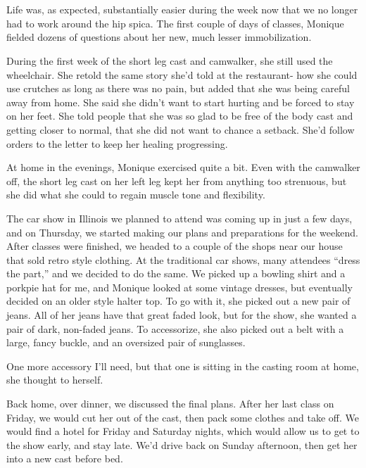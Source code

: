 \chapter{}

Life was, as expected, substantially easier during the week now that we no longer had to work
around the hip spica. The first couple of days of classes, Monique fielded dozens of questions
about her new, much lesser immobilization.

During the first week of the short leg cast and camwalker, she still used the wheelchair. She
retold the same story she'd told at the restaurant- how she could use crutches as long as there
was no pain, but added that she was being careful away from home. She said she didn't want to
start hurting and be forced to stay on her feet. She told people that she was so glad to be free
of the body cast and getting closer to normal, that she did not want to chance a setback. She'd
follow orders to the letter to keep her healing progressing.

At home in the evenings, Monique exercised quite a bit. Even with the camwalker off, the short
leg cast on her left leg kept her from anything too strenuous, but she did what she could to
regain muscle tone and flexibility.

The car show in Illinois we planned to attend was coming up in just a few days, and on
Thursday, we started making our plans and preparations for the weekend. After classes were
finished, we headed to a couple of the shops near our house that sold retro style clothing. At
the traditional car shows, many attendees ``dress the part,'' and we decided to do the same. We
picked up a bowling shirt and a porkpie hat for me, and Monique looked at some vintage dresses,
but eventually decided on an older style halter top. To go with it, she picked out a new pair of
jeans. All of her jeans have that great faded look, but for the show, she wanted a pair of dark,
non-faded jeans. To accessorize, she also picked out a belt with a large, fancy buckle, and an
oversized pair of sunglasses.

One more accessory I'll need, but that one is sitting in the casting room at home, she thought
to herself.

Back home, over dinner, we discussed the final plans. After her last class on Friday, we would
cut her out of the cast, then pack some clothes and take off. We would find a hotel for Friday
and Saturday nights, which would allow us to get to the show early, and stay late. We'd drive
back on Sunday afternoon, then get her into a new cast before bed.

